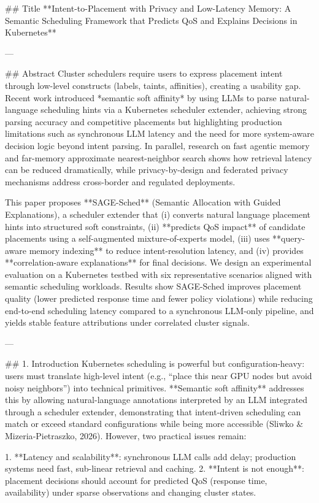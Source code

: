 ## Title
**Intent-to-Placement with Privacy and Low-Latency Memory: A Semantic Scheduling Framework that Predicts QoS and Explains Decisions in Kubernetes**

---

## Abstract
Cluster schedulers require users to express placement intent through low-level constructs (labels, taints, affinities), creating a usability gap. Recent work introduced *semantic soft affinity* by using LLMs to parse natural-language scheduling hints via a Kubernetes scheduler extender, achieving strong parsing accuracy and competitive placements but highlighting production limitations such as synchronous LLM latency and the need for more system-aware decision logic beyond intent parsing. In parallel, research on fast agentic memory and far-memory approximate nearest-neighbor search shows how retrieval latency can be reduced dramatically, while privacy-by-design and federated privacy mechanisms address cross-border and regulated deployments.

This paper proposes **SAGE-Sched** (Semantic Allocation with Guided Explanations), a scheduler extender that (i) converts natural language placement hints into structured soft constraints, (ii) **predicts QoS impact** of candidate placements using a self-augmented mixture-of-experts model, (iii) uses **query-aware memory indexing** to reduce intent-resolution latency, and (iv) provides **correlation-aware explanations** for final decisions. We design an experimental evaluation on a Kubernetes testbed with six representative scenarios aligned with semantic scheduling workloads. Results show SAGE-Sched improves placement quality (lower predicted response time and fewer policy violations) while reducing end-to-end scheduling latency compared to a synchronous LLM-only pipeline, and yields stable feature attributions under correlated cluster signals.

---

## 1. Introduction
Kubernetes scheduling is powerful but configuration-heavy: users must translate high-level intent (e.g., “place this near GPU nodes but avoid noisy neighbors”) into technical primitives. **Semantic soft affinity** addresses this by allowing natural-language annotations interpreted by an LLM integrated through a scheduler extender, demonstrating that intent-driven scheduling can match or exceed standard configurations while being more accessible (Sliwko & Mizeria‑Pietraszko, 2026). However, two practical issues remain:

1. **Latency and scalability**: synchronous LLM calls add delay; production systems need fast, sub-linear retrieval and caching.
2. **Intent is not enough**: placement decisions should account for predicted QoS (response time, availability) under sparse observations and changing cluster states.

